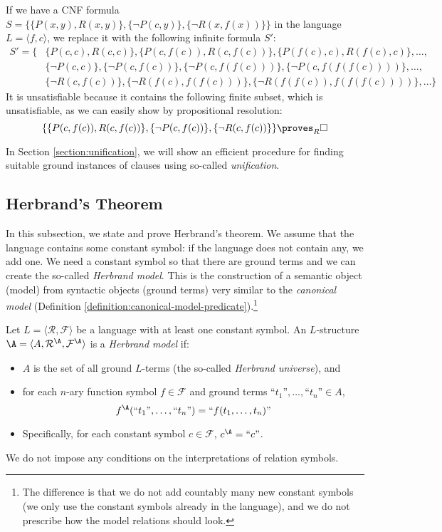 \begin{example}
If we have a CNF formula $S=\{\{P(x,y),R(x,y)\},\{\neg P(c,y)\},\{\neg R(x,f(x))\}\}$ in the language $L=\langle f,c\rangle$, we replace it with the following infinite formula $S'$:
\begin{align*}
    S'=\{&\{P(c,c),R(c,c)\},\{P(c,f(c)),R(c,f(c))\},\{P(f(c),c),R(f(c),c)\},\dots,\\ 
    &\{\neg P(c,c)\}, \{\neg P(c,f(c))\},\{\neg P(c,f(f(c)))\},\{\neg P(c,f(f(f(c))))\}, \dots,\\
    &\{\neg R(c,f(c))\}, \{\neg R(f(c),f(f(c)))\},\{\neg R(f(f(c)),f(f(f(c))))\},\dots\}    
\end{align*}
It is unsatisfiable because it contains the following finite subset, which is unsatisfiable, as we can easily show by propositional resolution:
$$
\{\{P(c,f(c)),R(c,f(c))\},\{\neg P(c,f(c))\},\{\neg R(c,f(c))\}\}\proves_R\square
$$
\end{example}
In Section \ref{section:unification}, we will show an efficient procedure for finding suitable ground instances of clauses using so-called \emph{unification}.

\subsection{Herbrand's Theorem}

In this subsection, we state and prove Herbrand's theorem. We assume that the language contains some constant symbol: if the language does not contain any, we add one. We need a constant symbol so that there are ground terms and we can create the so-called \emph{Herbrand model}. This is the construction of a semantic object (model) from syntactic objects (ground terms) very similar to the \emph{canonical model} (Definition \ref{definition:canonical-model-predicate}).\footnote{The difference is that we do not add countably many new constant symbols (we only use the constant symbols already in the language), and we do not prescribe how the model relations should look.}

\begin{definition}
Let $L=\langle\mathcal R,\mathcal F\rangle$ be a language with at least one constant symbol. An $L$-structure $\A=\langle A,\mathcal R^\A,\mathcal F^\A\rangle$ is a \emph{Herbrand model} if:
\begin{itemize}
    \item $A$ is the set of all ground $L$-terms (the so-called \emph{Herbrand universe}), and
    \item for each $n$-ary function symbol $f\in\mathcal F$ and ground terms $\text{``$t_1$''},\dots,\text{``$t_n$''}\in A$,
    $$
    f^\A(\text{``$t_1$''},\dots,\text{``$t_n$''})=\text{``$f(t_1,\dots,t_n)$''}
    $$
    \item Specifically, for each constant symbol $c\in\mathcal F$, $c^\A=\text{``$c$''}$.
\end{itemize}
We do not impose any conditions on the interpretations of relation symbols.
\end{definition}

